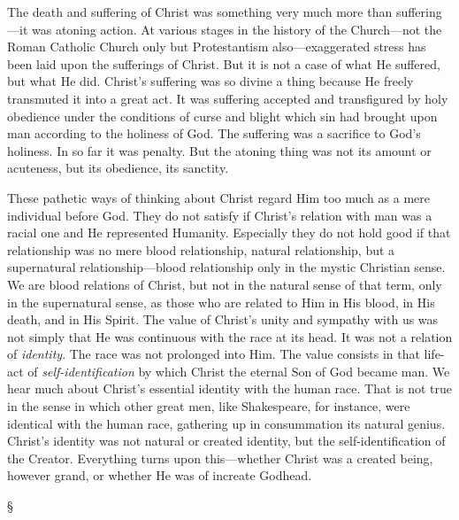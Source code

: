 \documentclass[12pt,a5paper,twoside,titlepage]{book}
\begin{document}
The death and suffering of Christ was something 
very much more than suffering---it was 
atoning action. At various stages in the history 
of the Church---not the Roman Catholic Church 
only but Protestantism also---exaggerated stress 
has been laid upon the sufferings of Christ. 
But it is not a case of what He suffered, but 
what He did. Christ's suffering was so divine 
a thing because He freely transmuted it into a 
great act. It was suffering accepted and transfigured 
by holy obedience under the conditions 
of curse and blight which sin had brought upon 
man according to the holiness of God. The 
suffering was a sacrifice to God's holiness. In 
so far it was penalty. But the atoning thing 
was not its amount or acuteness, but its 
obedience, its sanctity. 


These pathetic ways of thinking about Christ 
regard Him too much as a mere individual 
before God. They do not satisfy if Christ's 
relation with man was a racial one and He 
represented Humanity. Especially they do not 
hold good if that relationship was no mere 
blood relationship, natural relationship, but a 
supernatural relationship---blood relationship 
only in the mystic Christian sense. We are 
blood relations of Christ, but not in the natural 
sense of that term, only in the supernatural 
sense, as those who are related to Him in His 
blood, in His death, and in His Spirit. The 
value of Christ's unity and sympathy with us 
was not simply that He was continuous with 
the race at its head. It was not a relation 
of \textit{identity}. The race was not prolonged into 
Him. The value consists in that life-act of \textit{self-identification} 
by which Christ the eternal Son of 
God became man. We hear much about Christ's 
essential identity with the human race. That is 
not true in the sense in which other great men, 
like Shakespeare, for instance, were identical 
with the human race, gathering up in consummation 
its natural genius. Christ's identity was 
not natural or created identity, but the self-identification 
of the Creator. Everything turns 
upon this---whether Christ was a created being, 
however grand, or whether He was of increate 
Godhead. 

\begin{center}
\S
\end{center}
\end{document}
